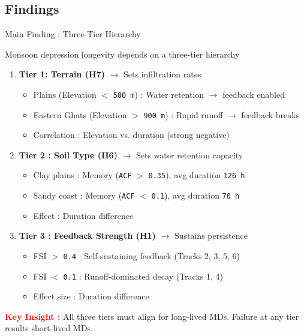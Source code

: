 \documentclass[8pt, aspectratio=169]{beamer}
\begin{document}
\subsection{Findings}
\begin{frame}{Main Finding : Three-Tier Hierarchy}
    \vspace{-0.2cm}
    \begin{block}{Monsoon depression longevity depends on a three-tier hierarchy}\end{block}
 
    \vspace{0.15cm}
    \footnotesize
    \begin{enumerate}
        \footnotesize
        \item \textbf{Tier 1: Terrain (H7)} $\rightarrow$ Sets infiltration rates
            \begin{itemize}\small
                \item Plains (Elevation $<$ \texttt{500 m}) : Water retention $\rightarrow$ feedback enabled
                \item Eastern Ghats (Elevation $>$ \texttt{900 m}) : Rapid runoff $\rightarrow$ feedback breaks
                \item Correlation : Elevation vs. duration (strong negative)
            \end{itemize}
        \footnotesize
        \item \textbf{Tier 2 : Soil Type (H6)} $\rightarrow$ Sets water retention capacity
            \begin{itemize}\small
                \item Clay plains : Memory (\texttt{ACF} $>$ \texttt{0.35}), avg duration \texttt{126 h}
                \item Sandy coast : Memory (\texttt{ACF} $<$ \texttt{0.1}), avg duration \texttt{70 h}
                \item Effect : Duration difference
            \end{itemize}
        \footnotesize
        \item \textbf{Tier 3 : Feedback Strength (H1)} $\rightarrow$ Sustains persistence
            \begin{itemize}\small
                \item FSI $>$ \texttt{0.4} : Self-sustaining feedback (Tracks 2, 3, 5, 6)
                \item FSI $<$ \texttt{0.1} : Runoff-dominated decay (Tracks 1, 4)
                \item Effect size : Duration difference
            \end{itemize}
    \end{enumerate}

    \vspace{0.08cm}
    \textbf{\textcolor{red}{Key Insight :}} All three tiers must align for long-lived MDs. Failure at any tier results short-lived MDs.
\end{frame}
\end{document}
